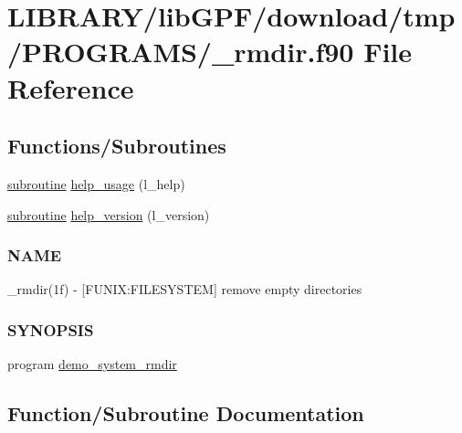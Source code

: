 \hypertarget{__rmdir_8f90}{}\section{L\+I\+B\+R\+A\+R\+Y/lib\+G\+P\+F/download/tmp/\+P\+R\+O\+G\+R\+A\+M\+S/\+\_\+rmdir.f90 File Reference}
\label{__rmdir_8f90}
\subsection*{Functions/\+Subroutines}
\begin{DoxyCompactItemize}
\item 
\hyperlink{M__stopwatch_83_8txt_acfbcff50169d691ff02d4a123ed70482}{subroutine} \hyperlink{__rmdir_8f90_a3e09a3b52ee8fb04eeb93fe5761626a8}{help\+\_\+usage} (l\+\_\+help)
\item 
\hyperlink{M__stopwatch_83_8txt_acfbcff50169d691ff02d4a123ed70482}{subroutine} \hyperlink{__rmdir_8f90_a39c21619b08a3c22f19e2306efd7f766}{help\+\_\+version} (l\+\_\+version)
\begin{DoxyCompactList}\small\item\em \subsubsection*{N\+A\+ME}

\+\_\+rmdir(1f) -\/ \mbox{[}F\+U\+N\+IX\+:F\+I\+L\+E\+S\+Y\+S\+T\+EM\mbox{]} remove empty directories \subsubsection*{S\+Y\+N\+O\+P\+S\+IS}\end{DoxyCompactList}\item 
program \hyperlink{__rmdir_8f90_a1002470a8ce0812244a0c83197f3a97d}{demo\+\_\+system\+\_\+rmdir}
\end{DoxyCompactItemize}


\subsection{Function/\+Subroutine Documentation}
\mbox{\label{__rmdir_8f90_a1002470a8ce0812244a0c83197f3a97d}} 
